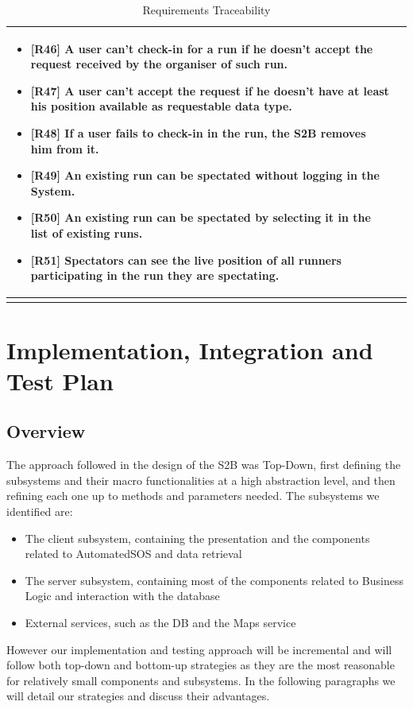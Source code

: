 \documentclass[titlepage]{article}
\begin{document}
\begin{longtable}{| p{5 cm} | p{8 cm} |}
\begin{itemize}
			\item {\bf [R46]} A user can’t check-in for a run if he doesn’t accept the request received by the organiser of such run.
			\item {\bf [R47]} A user can’t accept the request if he doesn’t have at least his position available as requestable data type.
			\item {\bf [R48]} If a user fails to check-in in the run, the S2B removes him from it.
			\item {\bf [R49]} An existing run can be spectated without logging in the System.
			\item {\bf [R50]} An existing run can be spectated by selecting it in the list of existing runs.
			\item {\bf [R51]} Spectators can see the live position of all runners participating in the run they are spectating.
		\end{itemize}		
		\\	 \hline		
		\caption{Requirements Traceability}	
						
	\end{longtable}

\pagebreak

\section{Implementation, Integration and Test Plan}
\subsection{Overview}
The approach followed in the design of the S2B was Top-Down, first defining the subsystems and their macro functionalities at a high abstraction level, and then refining each one up to methods and parameters needed. 
The subsystems we identified are:
\begin{itemize}
    \item The client subsystem, containing the presentation and the components related to AutomatedSOS and data retrieval
    \item The server subsystem, containing most of the components related to Business Logic and interaction with the database
    \item External services, such as the DB and the Maps service
\end{itemize}
However our implementation and testing approach will be incremental and will follow both top-down and bottom-up strategies as they are the most reasonable for relatively small components and subsystems. In the following paragraphs we will detail our strategies and discuss their advantages. 
\end{document}

